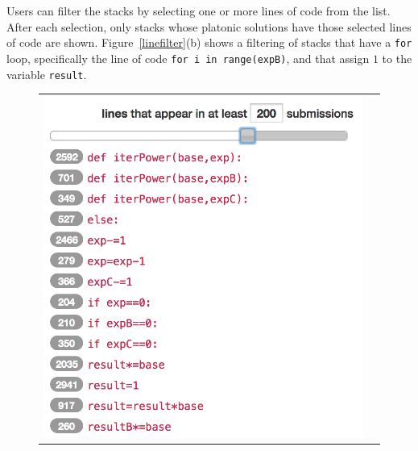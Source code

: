 \documentclass[12pt,twoside]{mitthesis}
\newcommand \codevar[1]{\texttt{#1}}
\begin{document}
Users can filter the stacks by selecting one or more lines of code from the list. After each selection, only stacks whose platonic solutions have those selected lines of code are shown. Figure~\ref{linefilter}(b) shows a filtering of stacks that have a \codevar{for} loop, specifically the line of code \codevar{for i in range(expB)}, and that assign $1$ to the variable \codevar{result}.

\begin{figure}[htpb]
\begin{tabular}{c | c}
\begin{minipage}{.48\linewidth}
\centering
\includegraphics[scale=0.5]{Body/figures/overcode/lineSlider.png}
\end{minipage}
&
\begin{minipage}{.52\linewidth}
\centering

\end{minipage}
\end{tabular}
\end{figure}
\end{document}
